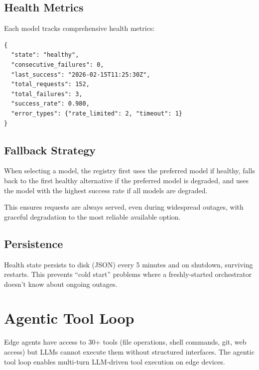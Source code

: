 \documentclass[conference]{IEEEtran}
\begin{document}
\subsection{Health Metrics}

Each model tracks comprehensive health metrics:

\begin{lstlisting}[style=jsoncode]
{
  "state": "healthy",
  "consecutive_failures": 0,
  "last_success": "2026-02-15T11:25:30Z",
  "total_requests": 152,
  "total_failures": 3,
  "success_rate": 0.980,
  "error_types": {"rate_limited": 2, "timeout": 1}
}
\end{lstlisting}

\subsection{Fallback Strategy}

When selecting a model, the registry first uses the preferred model if healthy, falls back to the first healthy alternative if the preferred model is degraded, and uses the model with the highest success rate if all models are degraded.

This ensures requests are always served, even during widespread outages, with graceful degradation to the most reliable available option.

\subsection{Persistence}

Health state persists to disk (JSON) every 5 minutes and on shutdown, surviving restarts. This prevents ``cold start'' problems where a freshly-started orchestrator doesn't know about ongoing outages.



\section{Agentic Tool Loop}
\label{sec:toolloop}

Edge agents have access to 30+ tools (file operations, shell commands, git, web access) but LLMs cannot execute them without structured interfaces. The agentic tool loop enables multi-turn LLM-driven tool execution on edge devices.
\end{document}
